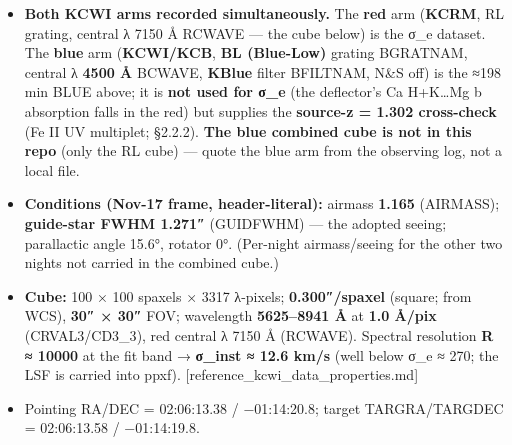 \documentclass[
]{article}
\newcommand{\BreakablePath}[1]{{\ttfamily\sloppy #1}}
\begin{document}
\begin{itemize}
  → \textbf{36 × 300 s ≈ 180 min RED + ≈ 198 min BLUE on-source.} The
  NEW
  \textbf{\BreakablePath{\_\discretionary{}{}{}mtwdo\_\discretionary{}{}{}}}
  reduction (Master-Twilight + Dome hybrid flats, K. R. Gupta),
  \BreakablePath{Nov17\_\discretionary{}{}{}2025\_\discretionary{}{}{}DESJ0206\_\discretionary{}{}{}RL\_\discretionary{}{}{}combined\_\discretionary{}{}{}mtwdo\_\discretionary{}{}{}icubes\_\discretionary{}{}{}wcs.\discretionary{}{}{}fits};
  dithered (PA 0°/45°/90°); CR rejection via \textbf{astroscrappy}
  (\BreakablePath{fsmode=median},
  \BreakablePath{psffwhm=2.\discretionary{}{}{}50}).
  \BreakablePath{OBSERVER} = Glazebrook, Gupta, Jones, Kacprzak, Alcorn,
  Rhoades, Barone, Tran, Chen, Vasa. \emph{(K409 PI + Aug-30 DIMM seeing
  still TBD for acknowledgements.)}
\item
  \textbf{Both KCWI arms recorded simultaneously.} The \textbf{red} arm
  (\textbf{KCRM}, RL grating, central λ 7150 Å \BreakablePath{RCWAVE}
  --- the cube below) is the σ\_e dataset. The \textbf{blue} arm
  (\textbf{KCWI/KCB}, \textbf{BL (Blue-Low)} grating
  \BreakablePath{BGRATNAM}, central λ \textbf{4500 Å}
  \BreakablePath{BCWAVE}, \textbf{KBlue} filter
  \BreakablePath{BFILTNAM}, N\&S off) is the ≈198 min BLUE above; it is
  \textbf{not used for σ\_e} (the deflector's Ca H+K\ldots Mg b
  absorption falls in the red) but supplies the \textbf{source-z = 1.302
  cross-check} (Fe II UV multiplet; §2.2.2). \textbf{The blue combined
  cube is not in this repo} (only the RL cube) --- quote the blue arm
  from the observing log, not a local file.
\item
  \textbf{Conditions (Nov-17 frame, header-literal):} airmass
  \textbf{1.165} (\BreakablePath{AIRMASS}); \textbf{guide-star FWHM
  1.271″} (\BreakablePath{GUIDFWHM}) --- the adopted seeing; parallactic
  angle 15.6°, rotator 0°. (Per-night airmass/seeing for the other two
  nights not carried in the combined cube.)
\item
  \textbf{Cube:} 100 × 100 spaxels × 3317 λ-pixels;
  \textbf{0.300″/spaxel} (square; from WCS), \textbf{30″ × 30″} FOV;
  wavelength \textbf{5625--8941 Å} at \textbf{1.0 Å/pix}
  (\BreakablePath{CRVAL3}/\BreakablePath{CD3\_\discretionary{}{}{}3}),
  red central λ 7150 Å (\BreakablePath{RCWAVE}). Spectral resolution
  \textbf{R ≈ 10000} at the fit band → \textbf{σ\_inst ≈ 12.6 km/s}
  (well below σ\_e ≈ 270; the LSF is carried into ppxf).
  {[}reference\_kcwi\_data\_properties.md{]}
\item
  Pointing \BreakablePath{RA}/\BreakablePath{DEC} = 02:06:13.38 /
  −01:14:20.8; target \BreakablePath{TARGRA}/\BreakablePath{TARGDEC} =
  02:06:13.58 / −01:14:19.8.
\end{itemize}
\end{document}
